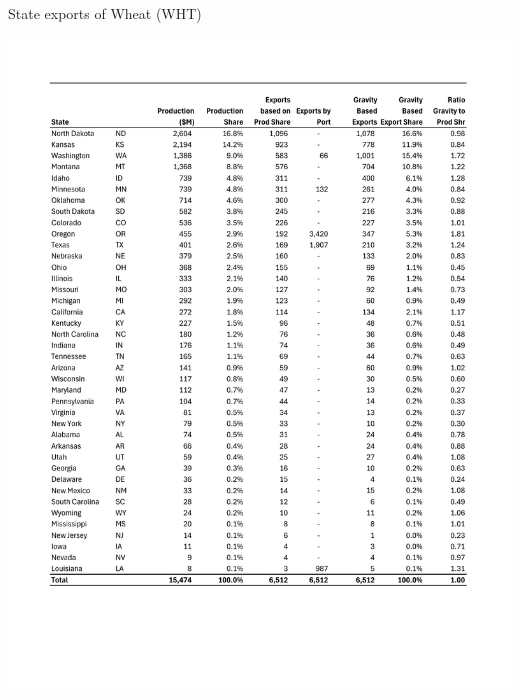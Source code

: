 \documentclass{ejb}
\begin{document}
\begin{table}
\caption{State exports of Wheat (WHT)}
\includegraphics[scale=0.7]{Wheat.pdf}
\end{table}

\newpage

\end{document}
